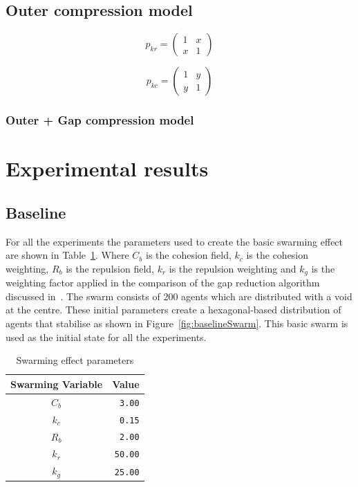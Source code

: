 \documentclass[12pt,a4paper]{IEEEtran}
\begin{document}
\subsection{Outer compression model}

\begin{equation}
p_{kr} = \left (
\begin{array}{cc}
1 & x\\
x & 1
\end{array} \right )
\end{equation}

\begin{equation}
p_{kc} = \left (
\begin{array}{cc}
1 & y\\
y & 1
\end{array} \right )
\end{equation}

\subsubsection{Outer + Gap compression model}

\section{Experimental results\label{sec:ExperimentalResults}}
\subsection{Baseline}
For all the experiments the parameters used to create the basic swarming effect are shown in Table~\ref{tab:swarmingEffect}. Where $C_b$ is the cohesion field, $k_c$ is the cohesion weighting, $R_b$ is the repulsion field, $k_r$ is the repulsion weighting and $k_g$ is the weighting factor applied in the comparison of the gap reduction algorithm discussed in~\cite{eliot2019void}. The swarm consists of 200 agents which are distributed with a void at the centre. These initial parameters create a hexagonal-based distribution of agents that stabilise as shown in Figure~\ref{fig:baselineSwarm}. This basic swarm is used as the initial state for all the experiments. 
 \begin{table}[h]
	\centering
	\tiny
	\begin{tabular}{|c|r|}
		\hline
		\rowcolor[HTML]{000000} 
		{\color[HTML]{FFFFFF} Swarming Variable} & {\color[HTML]{FFFFFF} Value} \\ \hline
		$C_b$ & \texttt{3.00} \\ \hline
		$k_c$ & \texttt{0.15}  \\ \hline
		$R_b$ & \texttt{2.00} \\ \hline
		$k_r$ & \texttt{50.00} \\ \hline
		$k_g$ & \texttt{25.00} \\ \hline
	\end{tabular}
  	\caption{Swarming effect parameters}
  	\label{tab:swarmingEffect}
\end{table}
\end{document}
